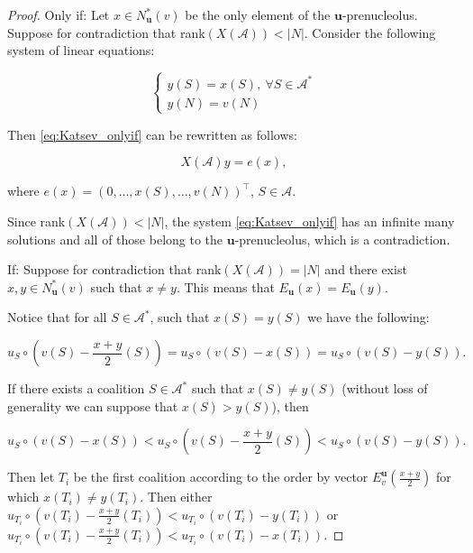 \documentclass[a4paper,12pt]{article}
\theoremstyle{definition}
\theoremstyle{remark}
\begin{document}
\begin{proof}
Only if: Let $x \in N_{\mathbf{u}}^\ast (v)$ be the only element of the $\mathbf{u}$-prenucleolus. Suppose for contradiction that rank$(X(\mathcal{A})) < |N|$. Consider the following system of linear equations:

\begin{equation}\label{eq:Katsev_onlyif}
\begin{cases}
y(S)  = x(S), \ \forall S\in \mathcal{A}^* \\
y(N)  = v(N)
\end{cases}
\end{equation}

\noindent  Then \eqref{eq:Katsev_onlyif} can be rewritten as follows:

\begin{equation*}
X(\mathcal{A})y = e(x),
\end{equation*}

\noindent where $e(x) = (0,\dots , x(S), \dots, v(N))^\top$, $S\in \mathcal{A}$.

Since %
 rank$(X(\mathcal{A})) < |N|$, the system \eqref{eq:Katsev_onlyif} has an infinite many solutions and all of those belong to the $\mathbf{u}$-prenucleolus, which is a contradiction.
 
\bigskip

If: Suppose for contradiction that rank$(X(\mathcal{A})) = |N|$ and there exist $x, y \in N_{\mathbf{u}}^\ast(v)$ such that $x \neq y$. This means that $E_{\mathbf{u}}(x) = E_{\mathbf{u}}(y)$.

Notice that for all $S\in \mathcal{A}^\ast$, such that $x(S) = y(S)$ we have the following:

\begin{equation*}
u_S \circ \left(v(S) - \frac{x+y}{2}(S)\right) = u_S\circ (v(S)-x(S)) =  u_S\circ (v(S)-y(S)).
\end{equation*}

If there exists a coalition $S\in \mathcal{A}^*$ such that $x(S) \neq y(S)$ (without loss of generality we can suppose that $x(S) > y(S)$), then 

\begin{equation*}
u_S\circ (v(S)-x(S)) < u_S \circ \left(v(S) - \frac{x+y}{2}(S)\right) < u_S\circ (v(S)-y(S)).
\end{equation*}

Then let $T_i$ be the first coalition  according to the order by vector $E_v^{\mathbf{u}} (\frac{x+y}{2})$ for which $x(T_i) \neq y(T_i)$. Then either  $u_{T_i} \circ (v(T_i) - \frac{x+y}{2}(T_i)) < u_{T_i}\circ (v(T_i)-y(T_i))$ or $u_{T_i} \circ (v(T_i) - \frac{x+y}{2}(T_i)) < u_{T_i}\circ (v(T_i)-x(T_i))$.


\end{proof}
\end{document}
